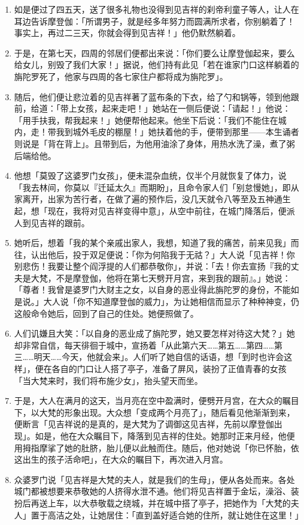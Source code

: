 \begin{enumerate}
\item 如是便过了四五天，送了很多礼物也没得到见吉祥的刹帝利童子等人，让人在耳边告诉摩登伽：「所谓男子，就是经多年努力而圆满所求者，你别躺着了！事实上，再过二三天，你就会得到见吉祥！」他仍默然躺着。
\item 于是，在第七天，四周的邻居们便都出来说：「你们要么让摩登伽起来，要么给女儿，别毁了我们大家！」据说，他们持有此见「若在谁家门口这样躺着的旃陀罗死了，他家与四周的各七家住户都将成为旃陀罗」。
\item 随后，他们便让悲泣着的见吉祥著了蓝布条的下衣，给了勺和锅等，领到他跟前，给道：「带上女孩，起来走吧！」她站在一侧后便说：「请起！」他说：「用手扶我，帮我起来！」她便帮他起来。他坐下后说：「我们不能住在城内，走！带我到城外毛皮的棚屋！」她扶着他的手，便带到那里——本生诵者则说是「背在背上」。且带到后，为他用油涂了身体，用热水洗了澡，煮了粥后端给他。
\item 他想「莫毁了这婆罗门女孩」，便未混杂血统，仅半个月就恢复了体力，说「我去林间，你莫以『迁延太久』而期盼」，且命令家人们「别怠慢她」，即从家离开，出家为苦行者，在做了遍的预作后，没几天就令八等至及五神通生起，想「现在，我将对见吉祥变得中意」，从空中前往，在城门降落后，便派人到见吉祥的跟前。
\item 她听后，想着「我的某个亲戚出家人，我想，知道了我的痛苦，前来见我」而往，认出他后，投于双足便说：「你为何陷我于无祜？」大人说「见吉祥！你别悲伤！我要让整个阎浮提的人们都恭敬你」，并说：「去！你去宣扬『我的丈夫是大梵，不是摩登伽，他将在第七天劈开月宫，来到我的跟前』。」她说：「尊者！我曾是婆罗门大财主之女，以自身的恶业得此旃陀罗的身份，不能如是说。」大人说「你不知道摩登伽的威力」，为让她相信而显示了种种神变，仍这般命令她后，回到了自己的住处。她便照做了。
\item 人们讥嫌且大笑：「以自身的恶业成了旃陀罗，她又要怎样对待这大梵？」她却非常自信，每天徘徊于城中，宣扬着「从此第六天……第五……第四……第三……明天……今天，他就会来」。人们听了她自信的话语，想「到时也许会这样」，便在各自的门口让人搭了亭子，准备了屏风，装扮了正值青春的女孩「当大梵来时，我们将布施少女」，抬头望天而坐。
\item 于是，大人在满月的这天，当月亮在空中盈满时，便劈开月宫，在大众的瞩目下，以大梵的形象出现。大众想「变成两个月亮了」，随后看见他渐渐到来，便断言「见吉祥说的是真的，是大梵为了调御这见吉祥，先前以摩登伽出现」。如是，他在大众瞩目下，降落到见吉祥的住处。她那时正来月经，他便用拇指摩挲了她的肚脐，胎儿便以此触而住。随后，他对她说「你已怀胎，依这出生的孩子活命吧」，在大众的瞩目下，再次进入月宫。
\item 众婆罗门说「见吉祥是大梵的夫人，就是我们的生母」，便从各处而来。各处城门都被想要来恭敬她的人挤得水泄不通。他们将见吉祥置于金坛，澡浴、装扮后再送上车，以大恭敬载之绕城，并在城中搭了亭子，把她作为「大梵的夫人」置于高洁之处，让她居住：「直到盖好适合她的住所，就让她住在这里！」

\end{enumerate}
